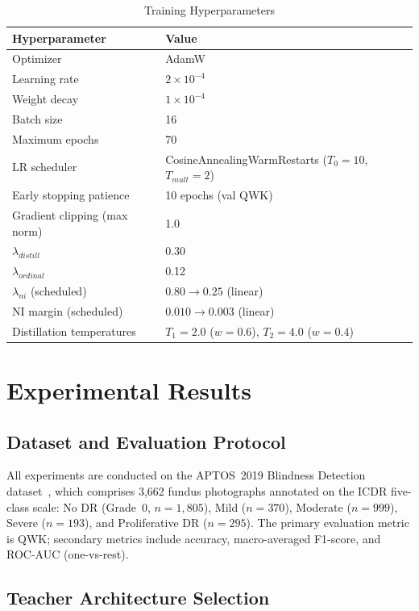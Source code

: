 \documentclass[10pt, twocolumn]{article}
\begin{document}
\begin{table}[h]
\centering
\caption{Training Hyperparameters}
\label{tab:hyperparams}
\small
\begin{tabular}{ll}
\toprule
\textbf{Hyperparameter} & \textbf{Value} \\
\midrule
Optimizer & AdamW \\
Learning rate & $2 \times 10^{-4}$ \\
Weight decay & $1 \times 10^{-4}$ \\
Batch size & 16 \\
Maximum epochs & 70 \\
LR scheduler & CosineAnnealingWarmRestarts ($T_0{=}10$, $T_{mult}{=}2$) \\
Early stopping patience & 10 epochs (val QWK) \\
Gradient clipping (max norm) & 1.0 \\
$\lambda_{distill}$ & 0.30 \\
$\lambda_{ordinal}$ & 0.12 \\
$\lambda_{ni}$ (scheduled) & $0.80 \to 0.25$ (linear) \\
NI margin (scheduled) & $0.010 \to 0.003$ (linear) \\
Distillation temperatures & $T_1{=}2.0$ ($w{=}0.6$), $T_2{=}4.0$ ($w{=}0.4$) \\
\bottomrule
\end{tabular}
\end{table}

\section{Experimental Results}

\subsection{Dataset and Evaluation Protocol}

All experiments are conducted on the APTOS~2019 Blindness Detection
dataset~\cite{aptos2019}, which comprises 3,662 fundus photographs annotated on the
ICDR five-class scale: No DR (Grade~0, $n{=}1{,}805$), Mild ($n{=}370$), Moderate
($n{=}999$), Severe ($n{=}193$), and Proliferative DR ($n{=}295$). The primary
evaluation metric is QWK; secondary metrics include accuracy, macro-averaged
F1-score, and ROC-AUC (one-vs-rest).

\subsection{Teacher Architecture Selection}
\label{sec:teacher_selection}
\end{document}

